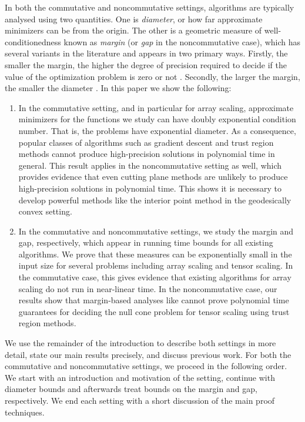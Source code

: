 \documentclass[10pt,a4paper]{article}
\numberwithin{equation}{section}
\begin{document}
In both the commutative and noncommutative settings, algorithms are typically analysed using two quantities. One is \emph{diameter}, or how far approximate minimizers can be from the origin. The other is a geometric measure of well-conditionedness known as \emph{margin} (or \emph{gap} in the noncommutative case), which has several variants in the literature and appears in two primary ways. Firstly, the smaller the margin, the higher the degree of precision required to decide if the value of the optimization problem is zero or not \cite{gradflow, gurvits2004combinatorial}. Secondly, the larger the margin, the smaller the diameter \cite{singh2014entropy,straszak2017computing,gradflow,burgisser2020interior}. In this paper we show the following:


\begin{enumerate} 
\item[i)] In the commutative setting, and in particular for array scaling, approximate minimizers for the functions we study can have doubly exponential condition number. That is, the problems have exponential diameter. As a consequence, popular classes of algorithms such as gradient descent and trust region methods cannot produce high-precision solutions in polynomial time in general. This result applies in the noncommutative setting as well, which provides evidence that even cutting plane methods are unlikely to produce high-precision solutions in polynomial time. This shows it is necessary to develop powerful methods like the interior point method in the geodesically convex setting. 
\item[ii)] In the commutative and noncommutative settings, we study the margin and gap, respectively, which appear in running time bounds for all existing algorithms. We prove that these measures can be exponentially small in the input size for several problems including array scaling and tensor scaling. In the commutative case, this gives evidence that existing algorithms for array scaling do not run in near-linear time. In the noncommutative case, our results show that margin-based analyses like \cite{gradflow} cannot prove polynomial time guarantees for deciding the null cone problem for tensor scaling using trust region methods. 
\end{enumerate} 


We use the remainder of the introduction to describe both settings in more detail, state our main results precisely, and discuss previous work. For both the commutative and noncommutative settings, we proceed in the following order. We start with an introduction and motivation of the setting, continue with diameter bounds and afterwards treat bounds on the margin and gap, respectively. We end each setting with a short discussion of the main proof techniques.
\end{document}
